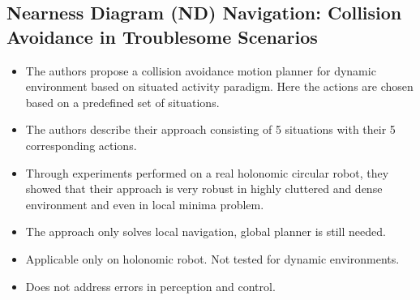 \documentclass[11pt]{article}
\begin{document}
\subsection{Nearness Diagram (ND) Navigation: Collision Avoidance in Troublesome Scenarios\cite{minguez2004nearness}}
\begin{itemize}
    \item The authors propose a collision avoidance motion planner for dynamic environment based on situated activity paradigm. Here the actions are chosen based on a predefined set of situations.
    \item The authors describe their approach consisting of 5 situations with their 5 corresponding actions.
    \color{green}    
    \item Through experiments performed on a real holonomic circular robot, they showed that their approach is very robust in highly cluttered and dense environment and even in local minima problem.
    \color{red}
    \item The approach only solves local navigation, global planner is still needed.
    \item Applicable only on holonomic robot. Not tested for dynamic environments.
    \item Does not address errors in perception and control.
    \color{black}
\end{itemize}



\end{document}
